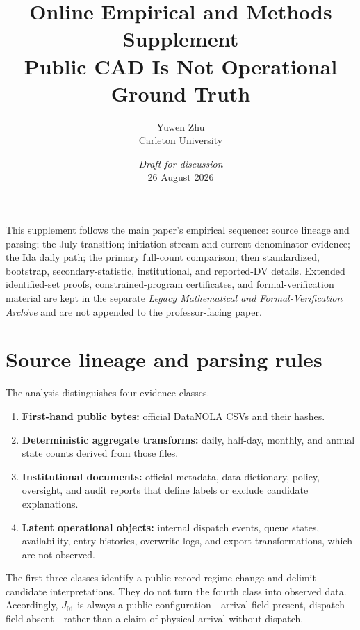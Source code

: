 \documentclass[11pt]{article}
\title{\vspace{-1.6em}\textbf{Online Empirical and Methods Supplement}\\[0.35em]
\large Public CAD Is Not Operational Ground Truth}
\author{Yuwen Zhu\\Carleton University}
\date{\textit{Draft for discussion}\\[0.2em]26 August 2026}
\begin{document}
\maketitle
\thispagestyle{plain}
\vspace{-1.2em}

\begin{plainbox}[title=Scope]
This supplement follows the main paper's empirical sequence: source lineage and parsing; the July transition; initiation-stream and current-denominator evidence; the Ida daily path; the primary full-count comparison; then standardized, bootstrap, secondary-statistic, institutional, and reported-DV details. Extended identified-set proofs, constrained-program certificates, and formal-verification material are kept in the separate \emph{Legacy Mathematical and Formal-Verification Archive} and are not appended to the professor-facing paper.
\end{plainbox}

\setcounter{tocdepth}{1}
\begingroup
\small
\tableofcontents
\endgroup
\newpage

\section{Source lineage and parsing rules}

The analysis distinguishes four evidence classes.
\begin{enumerate}
\item \textbf{First-hand public bytes:} official DataNOLA CSVs and their hashes.
\item \textbf{Deterministic aggregate transforms:} daily, half-day, monthly, and annual state counts derived from those files.
\item \textbf{Institutional documents:} official metadata, data dictionary, policy, oversight, and audit reports that define labels or exclude candidate explanations.
\item \textbf{Latent operational objects:} internal dispatch events, queue states, availability, entry histories, overwrite logs, and export transformations, which are not observed.
\end{enumerate}

The first three classes identify a public-record regime change and delimit candidate interpretations. They do not turn the fourth class into observed data. Accordingly, $J_{01}$ is always a public configuration---arrival field present, dispatch field absent---rather than a claim of physical arrival without dispatch.
\end{document}
